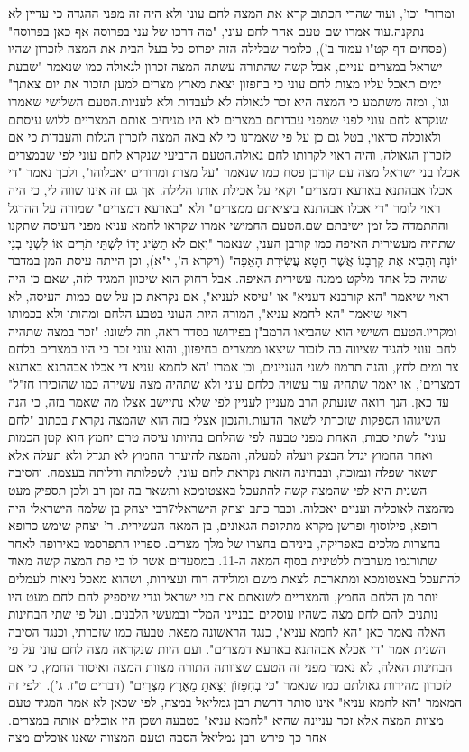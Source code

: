\documentclass[12pt, openany]{book}
\begin{document}
ומרור" וכו', ועוד שהרי הכתוב קרא את המצה לחם עוני ולא היה זה מפני ההגדה כי עדיין לא נתקנה.עוד אמרו שם טעם אחר לחם עוני, "מה דרכו של עני בפרוסה אף כאן בפרוסה" (פסחים דף קט"ו עמוד ב'), כלומר שבלילה הזה יפרוס כל בעל הבית את המצה לזכרון שהיו ישראל במצרים עניים, אבל קשה שהתורה עשתה המצה זכרון לגאולה כמו שנאמר "שבעת ימים תאכל עליו מצות לחם עוני כי בחפזון יצאת מארץ מצרים למען תזכור את יום צאתך" וגו', ומזה משתמע כי המצה היא זכר לגאולה לא לעבדות ולא לעניות.הטעם השלישי שאמרו שנקרא לחם עוני לפני שמפני עבדותם במצרים לא היו מניחים אותם המצריים ללוש עיסתם ולאוכלה כראוי, בטל גם כן על פי שאמרנו כי לא באה המצה לזכרון הגלות והעבדות כי אם לזכרון הגאולה, והיה ראוי לקרותו לחם גאולה.הטעם הרביעי שנקרא לחם עוני לפי שבמצרים אכלו בני ישראל מצה עם קורבן פסח כמו שנאמר "על מצות ומרורים יאכלוהו", ולכך נאמר "די אכלו אבהתנא בארעא דמצרים" וקאי על אכילת אותו הלילה. אך גם זה אינו שווה לי, כי היה ראוי לומר "די אכלו אבהתנא ביציאתם ממצרים" ולא "בארעא דמצרים" שמורה על ההרגל וההתמדה כל זמן ישיבתם שם.הטעם החמישי אמרו שקראו לחמא עניא מפני העיסה שתקנו שתהיה מעשירית האיפה כמו קורבן העני, שנאמר "וְאִם לֹא תַשִּׂיג יָדוֹ לִשְׁתֵּי תֹרִים אוֹ לִשְׁנֵי בְנֵי יוֹנָה וְהֵבִיא אֶת קָרְבָּנוֹ אֲשֶׁר חָטָא עֲשִׂירִת הָאֵפָה" (ויקרא ה', י"א), וכן הייתה עיסת המן במדבר שהיה כל אחד מלקט ממנה עשירית האיפה. אבל רחוק הוא שיכוון המגיד לזה, שאם כן היה ראוי שיאמר "הא קורבנא דעניא" או  "עיסא לעניא", אם נקראת כן על שם כמות העיסה, לא ראוי שיאמר "הא לחמא עניא", המורה היות העוני בטבע הלחם ומהותו ולא בכמותו ומקריו.הטעם השישי הוא שהביאו הרמב"ן בפירושו בסדר ראה, וזה לשונו: "זכר במצה שתהיה לחם עוני להגיד שציווה בה לזכור שיצאו ממצרים בחיפזון, והוא עוני זכר כי היו במצרים בלחם צר ומים לחץ, והנה תרמוז לשני העניינים, וכן אמרו 'הא לחמא עניא די אכלו אבהתנא בארעא דמצרים', או יאמר שתהיה עוד עשויה כלחם עוני ולא שתהיה מצה עשירה כמו שהזכירו חז"ל" עד כאן. הנך רואה שנעתק הרב מעניין לעניין לפי שלא נתיישב אצלו מה שאמר בזה, כי הנה השיגוהו הספקות שזכרתי לשאר הדעות.והנכון אצלי בזה הוא שהמצה נקראת בכתוב "לחם עוני" לשתי סבות, האחת מפני טבעה לפי שהלחם בהיותו עיסה טרם יחמץ הוא קטן הכמות ואחר החמוץ יגדל הבצק ויעלה למעלה, והמצה להיעדר החמוץ לא תגדל ולא תעלה אלא תשאר שפלה ונמוכה, ובבחינה הזאת נקראת לחם עוני, לשפלותה ודלותה בעצמה. והסיבה השנית היא לפי שהמצה קשה להתעכל באצטומכא ותשאר בה זמן רב ולכן תספיק מעט מהמצה לאוכליה ועניים יאכלוה. וכבר כתב יצחק הישראלי7רבי יצחק בן שלמה הישראלי היה רופא, פילוסוף ופרשן מקרא מתקופת הגאונים, בן המאה העשירית. ר' יצחק שימש כרופא בחצרות מלכים באפריקה, ביניהם בחצרו של מלך מצרים. ספריו התפרסמו באירופה לאחר שתורגמו מערבית ללטינית בסוף המאה ה-11. במסעדים אשר לו כי פת המצה קשה מאוד להתעכל באצטומכא ומתארכת לצאת משם ומולידה רוח ועצירות, ושהוא מאכל ניאות לעמלים יותר מן הלחם החמץ, והמצריים לשנאתם את בני ישראל וגדי שיספיק להם לחם מעט היו נותנים להם לחם מצה כשהיו עוסקים בבנייני המלך ובמעשי הלבנים. ועל פי שתי הבחינות האלה נאמר כאן "הא לחמא עניא", כנגד הראשונה מפאת טבעה כמו שזכרתי, וכנגד הסיבה השנית אמר "די אכלא אבהתנא בארעא דמצרים". ועם היות שנקראה מצה לחם עוני על פי הבחינות האלה, לא נאמר מפני זה הטעם שצוותה התורה מצוות המצה ואיסור החמץ, כי אם לזכרון מהירות גאולתם כמו שנאמר "כִּי בְחִפָּזוֹן יָצָאתָ מֵאֶרֶץ מִצְרַיִם" (דברים ט"ז, ג'). ולפי זה המאמר "הא לחמא עניא" אינו סותר דרשת רבן גמליאל במצה, לפי שכאן לא אמר המגיד טעם מצוות המצה אלא זכר עניינה שהיא "לחמא עניא" בטבעה ושכן היו אוכלים אותה במצרים. אחר כך פירש רבן גמליאל הסבה וטעם המצווה שאנו אוכלים מצה 
\end{document}
